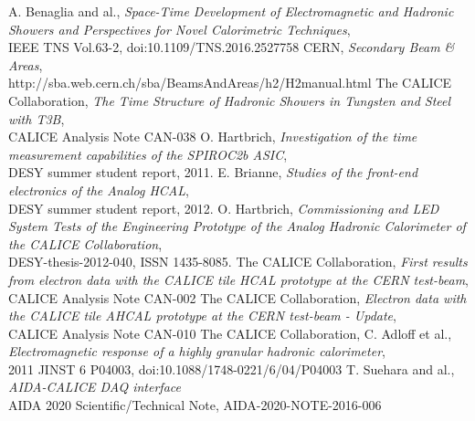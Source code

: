 \documentclass[twoside,a4paper,11pt]{article}
\begin{document}
\begin{thebibliography}{10}
	A. Benaglia and al., \textit{Space-Time Development of Electromagnetic and Hadronic Showers and Perspectives for Novel Calorimetric Techniques}, \\
	IEEE TNS Vol.63-2, doi:10.1109/TNS.2016.2527758
	CERN, \textit{Secondary Beam \& Areas}, \\
	http://sba.web.cern.ch/sba/BeamsAndAreas/h2/H2manual.html
	The CALICE Collaboration, \textit{The Time Structure of Hadronic Showers in Tungsten and Steel with T3B}, \\
	CALICE Analysis Note CAN-038
	 O. Hartbrich, \textit{Investigation of the time measurement capabilities of the SPIROC2b ASIC}, \\
	 DESY summer student report, 2011.
	 E. Brianne, \textit{Studies of the front-end electronics of the Analog HCAL}, \\
	 DESY summer student report, 2012.
	 O. Hartbrich, \textit{Commissioning and LED System Tests of the Engineering Prototype of the Analog Hadronic Calorimeter of the CALICE Collaboration}, \\
	 DESY-thesis-2012-040, ISSN 1435-8085.
	 The CALICE Collaboration, \textit{First results from electron data with the CALICE tile HCAL prototype at the CERN test-beam}, \\
	 CALICE Analysis Note CAN-002
	 The CALICE Collaboration, \textit{Electron data with the CALICE tile AHCAL prototype at the CERN test-beam - Update}, \\
	 CALICE Analysis Note CAN-010
	 The CALICE Collaboration, C. Adloff et al., \textit{Electromagnetic response of a highly granular hadronic calorimeter}, \\
	 2011 JINST 6 P04003, doi:10.1088/1748-0221/6/04/P04003
	 T. Suehara and al., \textit{AIDA-CALICE DAQ interface} \\
	 AIDA 2020 Scientific/Technical Note, AIDA-2020-NOTE-2016-006
\end{thebibliography}
\end{document}
